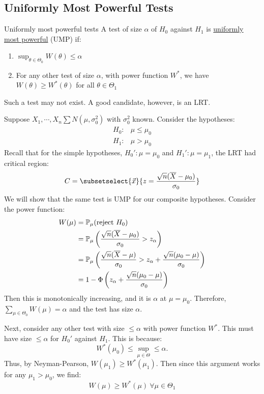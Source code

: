 \documentclass[../Main.tex]{subfiles}
\begin{document}
\subsection{Uniformly Most Powerful Tests}
\begin{definition}{Uniformly most powerful tests}
    A test of size $\alpha$ of $H_0$ against $H_1$ is \underline{uniformly most powerful} (UMP) if:
    \begin{enumerate}
        \item $\sup_{\theta \in \Theta_0} W(\theta) \leq \alpha$
        \item For any other test of size $\alpha$, with power function $W^*$, we have $W(\theta) \geq W^*(\theta)$ for all $\theta \in \Theta_1$
    \end{enumerate}
\end{definition}
\begin{remark}
    Such a test may not exist. A good candidate, however, is an LRT.
\end{remark}
\begin{example}
    Suppose $X_1, \cdots, X_n \sum N(\mu, \sigma_0^2)$ with $\sigma_0^2$ known. Consider the hypotheses:
    \begin{align*}
        H_0:&\mu \leq \mu_0 \\
        H_1:&\mu > \mu_0
    \end{align*}
    Recall that for the simple hypotheses, $H_0' : \mu = \mu_0$ and $H_1' : \mu = \mu_1$, the LRT had critical region:
    \begin{equation*}
        C = \subsetselect{\vec{x}}{z = \frac{\sqrt{n}(\overline{X} - \mu_0)}{\sigma_0}}
    \end{equation*}
    We will show that the same test is UMP for our composite hypotheses. Consider the power function:
    \begin{align*}
        W(\mu) &= \P_{\mu}(\text{reject $H_0$}) \\
        &= \P_\mu\left(\frac{\sqrt{n}(\overline{X} - \mu_0)}{\sigma_0} > z_\alpha\right) \\
        &= \P_\mu\left(\frac{\sqrt{n}(\overline{X} - \mu)}{\sigma_0} > z_\alpha + \frac{\sqrt{n}(\mu_0 - \mu)}{\sigma_0}\right) \\
        &= 1 - \Phi\left(z_\alpha + \frac{\sqrt{n}(\mu_0 - \mu)}{\sigma_0}\right)
    \end{align*}
    Then this is monotonically increasing, and it is $\alpha$ at $\mu = \mu_0$. Therefore, $\sum_{\mu \in \Theta_0} W(\mu) = \alpha$ and the test has size $\alpha$.

    Next, consider any other test with size $\leq \alpha$ with power function $W^*$. This must have size $\leq \alpha$ for $H_0'$ against $H_1$. This is because:
    \begin{equation*}
        W^*(\mu_0) \leq \sup_{\mu \in \Theta} \leq \alpha.
    \end{equation*}
    Thus, by Neyman-Pearson, $W(\mu_1) \geq W^*(\mu_1)$. Then since this argument works for any $\mu_1 > \mu_0$, we find:
    \begin{equation*}
        W(\mu) \geq W^*(\mu) ~\forall \mu \in \Theta_1
    \end{equation*}
\end{example}
\end{document}
